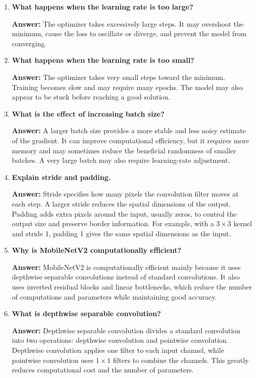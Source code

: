 \documentclass[10pt]{article}
\begin{document}
\begin{enumerate}
\item \textbf{What happens when the learning rate is too large?}

\textbf{Answer:} The optimizer takes excessively large steps. It may overshoot the minimum, cause the loss to oscillate or diverge, and prevent the model from converging.

\item \textbf{What happens when the learning rate is too small?}

\textbf{Answer:} The optimizer takes very small steps toward the minimum. Training becomes slow and may require many epochs. The model may also appear to be stuck before reaching a good solution.

\item \textbf{What is the effect of increasing batch size?}

\textbf{Answer:} A larger batch size provides a more stable and less noisy estimate of the gradient. It can improve computational efficiency, but it requires more memory and may sometimes reduce the beneficial randomness of smaller batches. A very large batch may also require learning-rate adjustment.

\item \textbf{Explain stride and padding.}

\textbf{Answer:} Stride specifies how many pixels the convolution filter moves at each step. A larger stride reduces the spatial dimensions of the output. Padding adds extra pixels around the input, usually zeros, to control the output size and preserve border information. For example, with a $3\times3$ kernel and stride 1, padding 1 gives the same spatial dimensions as the input.

\item \textbf{Why is MobileNetV2 computationally efficient?}

\textbf{Answer:} MobileNetV2 is computationally efficient mainly because it uses depthwise separable convolutions instead of standard convolutions. It also uses inverted residual blocks and linear bottlenecks, which reduce the number of computations and parameters while maintaining good accuracy.

\item \textbf{What is depthwise separable convolution?}

\textbf{Answer:} Depthwise separable convolution divides a standard convolution into two operations: depthwise convolution and pointwise convolution. Depthwise convolution applies one filter to each input channel, while pointwise convolution uses $1\times1$ filters to combine the channels. This greatly reduces computational cost and the number of parameters.


\end{enumerate}
\end{document}
